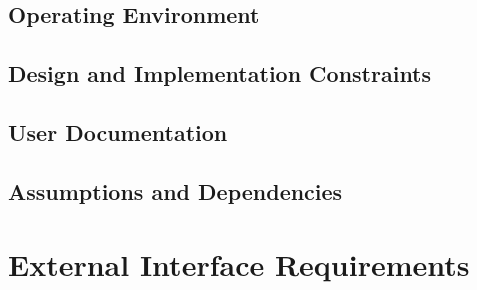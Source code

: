 \documentclass{article}
\newcommand{\comment}[1]{}
\begin{document}
\subsection{Operating Environment}
\comment{
Describe the enviroment in which the software will operate, including the hardware platform, operating systems and versions, and any other software components or applications with which it must peacefully coexist.
	}
\subsection{Design and Implementation Constraints}
\comment{
Descirbe any items or issues that will limit the options available to developers. These might include: corporate or regulatory policies; hardware limitations (timing requirements, memory requirements); interfaces to other applications; specific technologies, tools, and databases to be used, parallel operations; language requirements; communication protocols; security considerations; design conventions or programming standards (for example, if the customer's organization will be responsible for maintaining delivered software).
}
\subsection{User Documentation}
\comment{
List the user documentation components (such as user manuals, on-line help, and tutorials) that will be delivered along with the software. Identify any known user documentation delivery formats or standards.
	}
\subsection{Assumptions and Dependencies}
\comment{
List any assumed factors (as opposed to known facts) that could affect the requirements stated in the SRS. These could include third-party or commercial components that you plan to use, issues around the development environment, or constraints. The project could be affected if these assumptions are incorrect, are not shared, or change. Also identify any dependencies the project has on external factors, such as software components that you intent to reuse from another project, unless they are already documented elsewhere (for example, in the vision and scope document or the project plan)
	}
\section{External Interface Requirements}
\end{document}
